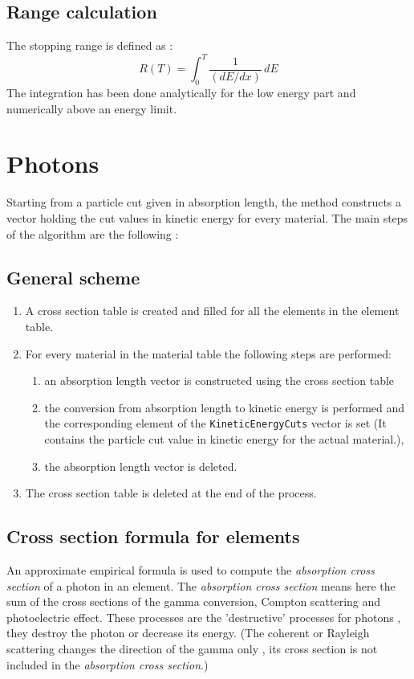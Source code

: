     \subsection{Range calculation}
     The stopping range is defined as : 
              \[ R(T)= \int_0^T \frac{1}{(dE/dx)} \, dE \]
     The integration has been done analytically for the low energy part and 
     numerically above an energy limit.
  

\section{Photons}
 Starting from a particle cut given in absorption length, the method
 constructs a vector holding the cut values in kinetic energy for every
 material. The main steps of the algorithm are the following :
    \subsection{General scheme}
       \begin{enumerate}
          \item A cross section table is created and filled for all the elements
                in the element table.
          \item For every material in the material table the following steps are
                performed:
                \begin{enumerate}
                    \item an absorption length  vector is constructed using the 
                          cross section table 
                    \item the conversion from absorption length to kinetic energy is
                          performed and the corresponding element of the 
                          {\tt KineticEnergyCuts} vector is set
                          (It contains the particle cut value in kinetic energy 
                           for the actual material.),
                    \item the absorption length vector is deleted.
                \end{enumerate}
           \item The cross section table is deleted at the end of the process.
       \end{enumerate}
    \subsection{Cross section formula for elements}
        An approximate empirical formula is used to compute the {\em absorption
        cross section} of a photon in an element.
        The {\em absorption cross section} means here the sum of the cross sections
        of the gamma conversion, Compton scattering and photoelectric effect. 
        These processes are the 'destructive' processes
        for photons , they destroy the photon or decrease its energy.
        (The coherent or Rayleigh scattering changes the direction of the gamma
        only , its cross section is not included in the {\em absorption cross section}.)
